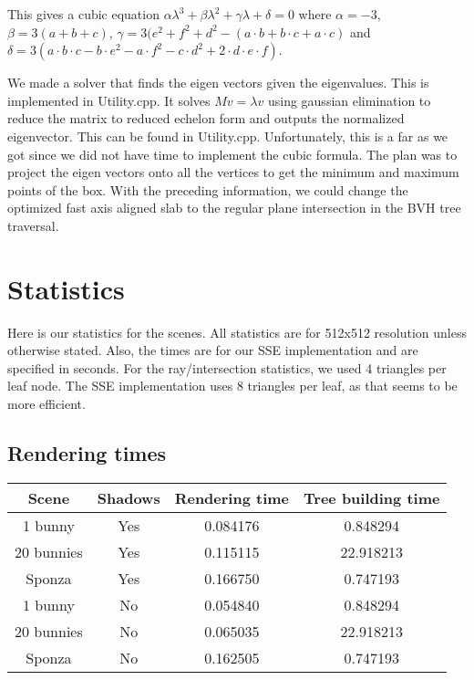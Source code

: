 \documentclass{article} %
\begin{document}
This gives a cubic equation $\alpha \lambda^3 + \beta \lambda^2 + \gamma \lambda + \delta = 0$ where $\alpha =-3$, $\beta=3(a + b + c)$, $\gamma=3(e^2 + f^2 + d^2 - (a\cdot b + b\cdot c + a\cdot c)$ and $\delta=3(a\cdot b\cdot c - b\cdot e^2 -a\cdot f^2 - c\cdot d^2 + 2\cdot d\cdot e\cdot f)$.

We made a solver that finds the eigen vectors given the eigenvalues. This is implemented in Utility.cpp. It solves $Mv=\lambda v$ using gaussian elimination to reduce the matrix to reduced echelon form and outputs the normalized eigenvector. This can be found in Utility.cpp. Unfortunately, this is a far as we got since we did not have time to implement the cubic formula. The plan was to project the eigen vectors onto all the vertices to get the minimum and maximum points of the box. With the preceding information, we could change the optimized fast axis aligned slab to the regular plane intersection in the BVH tree traversal. 

\section{Statistics}
Here is our statistics for the scenes. All statistics are for 512x512 resolution unless otherwise stated. Also, the times are for our SSE implementation and are specified in seconds. For the ray/intersection statistics, we used 4 triangles per leaf node. The SSE implementation uses 8 triangles per leaf, as that seems to be more efficient.

\subsection{Rendering times}
\begin{tabular}{cccc}
{\bf Scene} & {\bf Shadows} & {\bf Rendering time} & {\bf Tree building time}\\
\hline
1 bunny     & Yes & 0.084176 & 0.848294\\
20 bunnies  & Yes & 0.115115 & 22.918213\\
Sponza      & Yes & 0.166750 & 0.747193\\
1 bunny     & No  & 0.054840 & 0.848294\\
20 bunnies  & No  & 0.065035 & 22.918213\\
Sponza      & No  & 0.162505 & 0.747193\\
\end{tabular}
\end{document}
